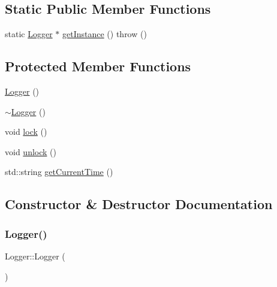\subsection*{Static Public Member Functions}
\begin{DoxyCompactItemize}
\item 
static \mbox{\hyperlink{class_c_plus_plus_logging_1_1_logger}{Logger}} $\ast$ \mbox{\hyperlink{class_c_plus_plus_logging_1_1_logger_afec28ae6d7bdf8f6a0734cb20756de10}{get\+Instance}} ()  throw ()
\end{DoxyCompactItemize}
\subsection*{Protected Member Functions}
\begin{DoxyCompactItemize}
\item 
\mbox{\hyperlink{class_c_plus_plus_logging_1_1_logger_abc41bfb031d896170c7675fa96a6b30c}{Logger}} ()
\item 
\mbox{\hyperlink{class_c_plus_plus_logging_1_1_logger_acb668a9e186a25fbaad2e4af6d1ed00a}{$\sim$\+Logger}} ()
\item 
void \mbox{\hyperlink{class_c_plus_plus_logging_1_1_logger_ad9ba90f0c8ee8e73ff2f6d7217cc08d2}{lock}} ()
\item 
void \mbox{\hyperlink{class_c_plus_plus_logging_1_1_logger_a28f2a5b3ccfaa9b233675bec5d7cd61d}{unlock}} ()
\item 
std\+::string \mbox{\hyperlink{class_c_plus_plus_logging_1_1_logger_a11ef26c5c5cca6c4d3f49a4b318757df}{get\+Current\+Time}} ()
\end{DoxyCompactItemize}


\subsection{Constructor \& Destructor Documentation}
\mbox{\label{class_c_plus_plus_logging_1_1_logger_abc41bfb031d896170c7675fa96a6b30c}} 
\subsubsection{\texorpdfstring{Logger()}{Logger()}}
{\footnotesize\ttfamily Logger\+::\+Logger (\begin{DoxyParamCaption}{ }\end{DoxyParamCaption})\hspace{0.3cm}{\ttfamily [protected]}}

